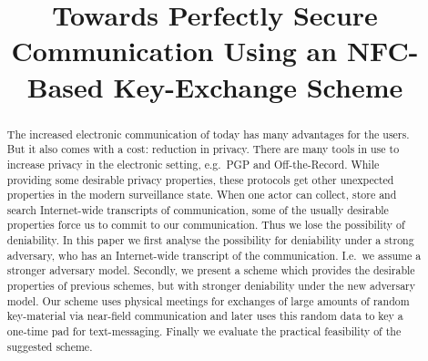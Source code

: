 \title{%
Towards Perfectly Secure Communication Using an NFC-Based Key-Exchange Scheme  
}

\maketitle
\begin{abstract}
  The increased electronic communication of today has many advantages for the 
  users.
  But it also comes with a cost: reduction in privacy.
  There are many tools in use to increase privacy in the electronic setting, 
  e.g.~PGP and Off-the-Record.
  While providing some desirable privacy properties, these protocols get other 
  unexpected properties in the modern surveillance state.
  When one actor can collect, store and search Internet-wide transcripts of 
  communication, some of the usually desirable properties force us to commit to 
  our communication.
  Thus we lose the possibility of deniability.
  In this paper we first analyse the possibility for deniability under a strong 
  adversary, who has an Internet-wide transcript of the communication.
  I.e.~we assume a stronger adversary model.
  Secondly, we present a scheme which provides the desirable properties of 
  previous schemes, but with stronger deniability under the new adversary 
  model.
  Our scheme uses physical meetings for exchanges of large amounts of random 
  key-material via near-field communication and later uses this random data to 
  key a one-time pad for text-messaging.
  Finally we evaluate the practical feasibility of the suggested scheme.

\end{abstract}


